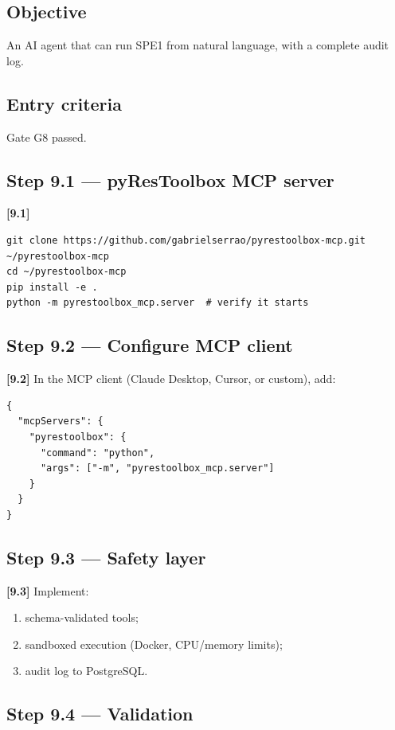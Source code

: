\documentclass[10pt,a4paper]{article}
\newcommand{\stepID}[1]{\textsf{\textbf{[#1]}}}
\begin{document}
\subsection{Objective}
An AI agent that can run SPE1 from natural language, with a complete audit log.

\subsection{Entry criteria}
Gate G8 passed.

\subsection{Step 9.1 --- pyResToolbox MCP server}

\stepID{9.1}
\begin{lstlisting}[style=sh]
git clone https://github.com/gabrielserrao/pyrestoolbox-mcp.git ~/pyrestoolbox-mcp
cd ~/pyrestoolbox-mcp
pip install -e .
python -m pyrestoolbox_mcp.server  # verify it starts
\end{lstlisting}

\subsection{Step 9.2 --- Configure MCP client}

\stepID{9.2} In the MCP client (Claude Desktop, Cursor, or custom), add:

\begin{lstlisting}[style=txt]
{
  "mcpServers": {
    "pyrestoolbox": {
      "command": "python",
      "args": ["-m", "pyrestoolbox_mcp.server"]
    }
  }
}
\end{lstlisting}

\subsection{Step 9.3 --- Safety layer}

\stepID{9.3} Implement:

\begin{enumerate}[leftmargin=1.4em]
  \item schema-validated tools;
  \item sandboxed execution (Docker, CPU/memory limits);
  \item audit log to PostgreSQL.
\end{enumerate}

\subsection{Step 9.4 --- Validation}
\end{document}
